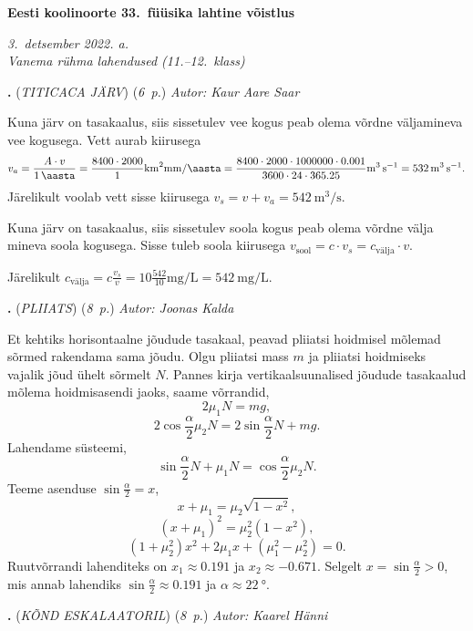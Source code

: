 \documentclass[11pt,a5paper]{article}
\newcommand{\numb}[1]{\vspace{5pt}\textbf{\large #1}}
\newcommand{\nimi}[1]{(\textsl{\small #1})}
\newcommand{\punktid}[1]{(\emph{#1~p.})}
\newcounter{ylesanne}
\newcommand{\yl}[1]{\addtocounter{ylesanne}{1}\numb{\theylesanne.} \nimi{#1} \newblock{}}
\newcommand{\autor}[1]{\emph{ Autor: #1}}%
\begin{document}
\begin{center}
  \textbf{\Large Eesti koolinoorte 33.\ füüsika lahtine võistlus} \par
  \emph{3.\ detsember 2022. a.\\Vanema rühma lahendused (11.--12.\ klass)}
\end{center}


\DeclareSIUnit{}

\yl{TITICACA JÄRV}
\punktid{6} \autor{Kaur Aare Saar}

Kuna järv on tasakaalus, siis sissetulev vee kogus peab olema võrdne väljamineva vee kogusega.
Vett aurab kiirusega 
\begin{gather*}
v_a = \frac{A \cdot v} {\SI{1}{\aasta}} = \frac{8400 \cdot 2000}{1} \si{\kilo\meter\squared\milli\meter\per \aasta} =
\frac{8400 \cdot 2000 \cdot 1000000 \cdot 0.001}{3600 \cdot 24 \cdot 365.25} \si{\meter\cubed\per\second} = \SI{532}{\meter\cubed\per\second}.
\end{gather*}
Järelikult voolab vett sisse kiirusega $v_s=v + v_a = \SI{542}{\meter\cubed\per\second}$.

Kuna järv on tasakaalus, siis sissetulev soola kogus peab olema võrdne välja mineva soola kogusega. Sisse tuleb soola kiirusega $v_{\text{sool}} = c \cdot v_s  = c_{\text{välja}} \cdot v$.

Järelikult $c_{\text{välja}} = c \frac{v_s}{v} = 10 \frac{542}{10} \si{\milli\gram\per\liter} = \SI{542}{\milli\gram\per\liter}$.


\yl{PLIIATS}
\punktid{8} \autor{Joonas Kalda}

Et kehtiks horisontaalne jõudude tasakaal, peavad pliiatsi hoidmisel mõlemad sõrmed rakendama sama jõudu. Olgu pliiatsi mass $m$ ja pliiatsi hoidmiseks vajalik jõud ühelt sõrmelt $N$. Pannes kirja vertikaalsuunalised jõudude tasakaalud mõlema hoidmisasendi jaoks, saame võrrandid,
\[2\mu_1 N = mg ,\]
\[2 \cos\frac{\alpha}{2}\mu_2N= 2\sin\frac{\alpha}{2}N + mg .\]
Lahendame süsteemi,
\[\sin\frac{\alpha}{2} N + \mu_1 N = \cos\frac{\alpha}{2}\mu_2 N .\]
Teeme asenduse $\sin{\frac{\alpha}{2}} = x$,
\[x + \mu_1 = \mu_2 \sqrt{1-x^2},\]
\[(x + \mu_1)^2 = \mu_2^2(1-x^2),\]
\[(1+\mu_2^2) x^2 + 2\mu_1 x + (\mu_1^2 - \mu_2^2) = 0.\]
Ruutvõrrandi lahenditeks on $x_1 \approx 0.191$ ja $x_2 \approx -0.671$. Selgelt  $x=\sin\frac{\alpha}{2} > 0$, mis annab lahendiks $\sin\frac{\alpha}{2} \approx 0.191$ ja $\alpha \approx \SI{22}{\degree}$.  

\yl{KÕND ESKALAATORIL}
\punktid{8} \autor{Kaarel Hänni}
\end{document}
